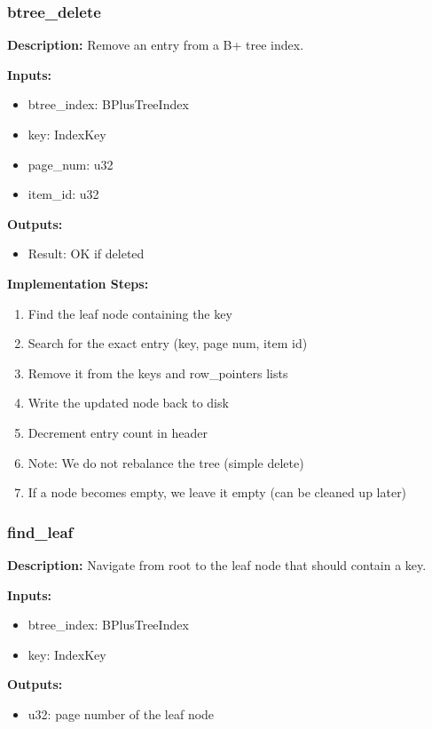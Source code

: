 \documentclass[11pt,a4paper]{article}
\begin{document}
\subsubsection{btree\_delete}

\textbf{Description:} Remove an entry from a B+ tree index.

\textbf{Inputs:}
\begin{itemize}
\item btree\_index: BPlusTreeIndex
\item key: IndexKey
\item page\_num: u32
\item item\_id: u32
\end{itemize}

\textbf{Outputs:}
\begin{itemize}
\item Result: OK if deleted
\end{itemize}

\textbf{Implementation Steps:}
\begin{enumerate}
\item Find the leaf node containing the key
\item Search for the exact entry (key, page num, item id)
\item Remove it from the keys and row\_pointers lists
\item Write the updated node back to disk
\item Decrement entry count in header
\item Note: We do not rebalance the tree (simple delete)
\item If a node becomes empty, we leave it empty (can be cleaned up later)
\end{enumerate}

\subsubsection{find\_leaf}

\textbf{Description:} Navigate from root to the leaf node that should contain a key.

\textbf{Inputs:}
\begin{itemize}
\item btree\_index: BPlusTreeIndex
\item key: IndexKey
\end{itemize}

\textbf{Outputs:}
\begin{itemize}
\item u32: page number of the leaf node
\end{itemize}
\end{document}
